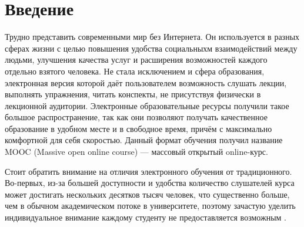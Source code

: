 \documentclass{matmex-diploma-custom}
\begin{document}
\maketitle
\tableofcontents
\section*{Введение}

Трудно представить современными мир без Интернета. Он используется в
разных сферах жизни с целью повышения удобства социальныхм
взаимодействий между людьми, улучшения качества услуг и расширения
возможностей каждого отдельно взятого человека.  Не стала исключением
и сфера образования, электронная версия которой даёт пользователем
возможность слушать лекции, выполнять упражнения, читать конспекты, не
присутствуя физически в лекционной аудитории. Электронные
образовательные ресурсы получили такое большое распространение, так
как они позволяют получать качественное образование в удобном месте и
в свободное время, причём с максимально комфортной для себя
скоростью. Данный формат обучения получил название MOOC (Massive open
online course) --- массовый открытый online-курс.

Стоит обратить внимание на отличия электронного обучения от
традиционного.  Во-первых, из-за большей доступности и удобства
количество слушателей курса может достигать нескольких десятков тысяч
человек, что существенно больше, чем в обычном академическом потоке в
университете, поэтому зачастую уделить индивидуальное внимание каждому
студенту не предоставляется возможным \cite{breslow2013studying}.
\end{document}
